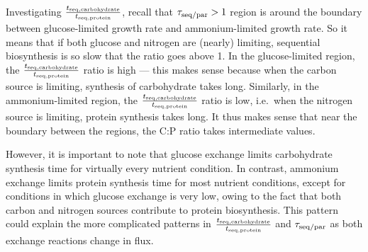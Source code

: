 Investigating $\frac{t_{\mathrm{seq},\mathrm{carbohydrate}}}{t_{\mathrm{seq},\mathrm{protein}}}$, recall that $\tau_{\mathrm{seq}/\mathrm{par}} > 1$ region is around the boundary between glucose-limited growth rate and ammonium-limited growth rate.
So it means that if both glucose and nitrogen are (nearly) limiting, sequential biosynthesis is so slow that the ratio goes above 1.
In the glucose-limited region, the $\frac{t_{\mathrm{seq},\mathrm{carbohydrate}}}{t_{\mathrm{seq},\mathrm{protein}}}$ ratio is high --- this makes sense because when the carbon source is limiting, synthesis of carbohydrate takes long.
Similarly, in the ammonium-limited region, the $\frac{t_{\mathrm{seq},\mathrm{carbohydrate}}}{t_{\mathrm{seq},\mathrm{protein}}}$ ratio is low, i.e.\ when the nitrogen source is limiting, protein synthesis takes long.
It thus makes sense that near the boundary between the regions, the C:P ratio takes intermediate values.

However, it is important to note that glucose exchange limits carbohydrate synthesis time for virtually every nutrient condition.
In contrast, ammonium exchange limits protein synthesis time for most nutrient conditions, except for conditions in which glucose exchange is very low, owing to the fact that both carbon and nitrogen sources contribute to protein biosynthesis.
This pattern could explain the more complicated patterns in $\frac{t_{\mathrm{seq},\mathrm{carbohydrate}}}{t_{\mathrm{seq},\mathrm{protein}}}$ and $\tau_{\mathrm{seq}/\mathrm{par}}$ as both exchange reactions change in flux.

